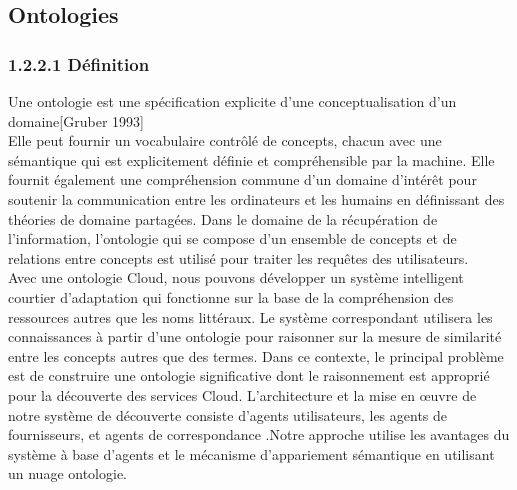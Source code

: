             \subsection{Ontologies}
                \subsubsection{1.2.2.1 Définition}
                     Une ontologie est une spécification explicite d’une conceptualisation d’un domaine[Gruber 1993]\\
                Elle peut fournir un vocabulaire contrôlé de concepts, chacun avec une sémantique qui est explicitement définie et compréhensible par la machine. Elle fournit également une compréhension commune d'un domaine d'intérêt pour soutenir la communication entre les ordinateurs et les humains en définissant des théories de domaine partagées. Dans le domaine de la récupération de l'information, l'ontologie qui se compose d'un ensemble de concepts et de relations entre concepts est utilisé pour traiter les requêtes des utilisateurs.\\
                Avec une ontologie Cloud, nous pouvons développer un système intelligent courtier d'adaptation qui fonctionne sur la base de la compréhension des ressources autres que les noms littéraux. Le système correspondant utilisera les connaissances à partir d'une ontologie pour raisonner sur la mesure de similarité entre les concepts autres que des termes. Dans ce contexte, le principal problème est de construire une ontologie significative dont le raisonnement est approprié pour la découverte des services Cloud. L'architecture et la mise en œuvre de notre système de découverte consiste d'agents utilisateurs, les agents de fournisseurs, et agents de correspondance .Notre approche utilise les avantages du système à base d'agents et le mécanisme d'appariement sémantique en utilisant un nuage ontologie.\\

